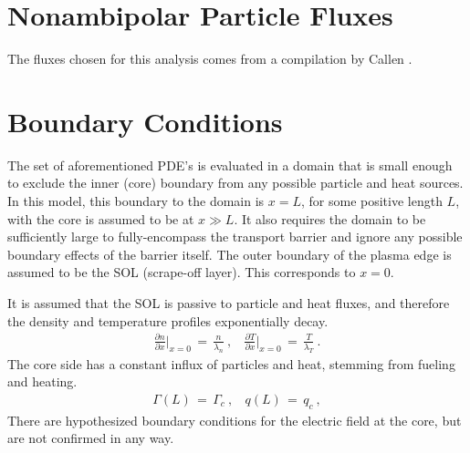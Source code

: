 \section{Nonambipolar Particle Fluxes}\label{sec:nonambipolar_fluxes}
The fluxes chosen for this analysis comes from a compilation by Callen \cite{callen_toroidal_2009}.

\section{Boundary Conditions}\label{sec:boundary_conditions}
The set of aforementioned PDE's is evaluated in a domain that is small enough to exclude the inner (core) boundary from any possible particle and heat sources.
In this model, this boundary to the domain is $x = L$, for some positive length $L$, with the core is assumed to be at $x \gg L$.
It also requires the domain to be sufficiently large to fully-encompass the transport barrier and ignore any possible boundary effects of the barrier itself.
The outer boundary of the plasma edge is assumed to be the SOL (scrape-off layer).
This corresponds to $x = 0$.

It is assumed that the SOL is passive to particle and heat fluxes, and therefore the density and temperature profiles exponentially decay.
\begin{align} %
	\frac{\partial n}{\partial x}\biggr \lvert_{x=0} \,=\, \frac{n}{\lambda_n}~, ~~~~
		\frac{\partial T}{\partial x}\biggr \lvert_{x=0} \,=\, \frac{T}{\lambda_T}~.\label{eq:nT_SOL_boundary}
\end{align}
The core side has a constant influx of particles and heat, stemming from fueling and heating.
\begin{align} %
	\Gamma(L) \,=\, \Gamma_c~, ~~~~ q(L) \,=\, q_c~,\label{eq:core_fluxes}
\end{align}
There are hypothesized boundary conditions for the electric field at the core, but are not confirmed in any way.

